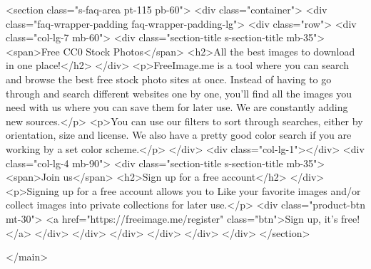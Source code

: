 <section class="s-faq-area pt-115 pb-60">
<div class="container">
<div class="faq-wrapper-padding faq-wrapper-padding-lg">
<div class="row">
<div class="col-lg-7 mb-60">
<div class="section-title s-section-title mb-35">
<span>Free CC0 Stock Photos</span>
<h2>All the best images to download in one place!</h2>
</div>
<p>FreeImage.me is a tool where you can search and browse the best free stock photo sites at once. Instead of having to go through and search different websites one by one, you'll find all the images you need with us where you can save them for later use. We are constantly adding new sources.</p>
<p>You can use our filters to sort through searches, either by orientation, size and license. We also have a pretty good color search if you are working by a set color scheme.</p>
</div>
<div class="col-lg-1"></div>
<div class="col-lg-4 mb-90">
<div class="section-title s-section-title mb-35">
<span>Join us</span>
<h2>Sign up for a free account</h2>
</div>
<p>Signing up for a free account allows you to Like your favorite images and/or collect images into private collections for later use.</p>
<div class="product-btn mt-30">
<a href="https://freeimage.me/register" class="btn">Sign up, it's free!</a>
</div>
</div>
</div>
</div>
</div>
</div>
</section>

</main>


